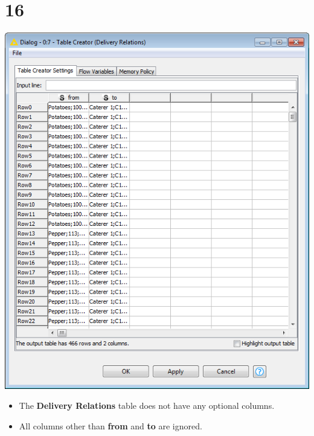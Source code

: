 \documentclass[10pt]{beamer}
\begin{document}
\section{16}
\begin{frame}
	\begin{center}
  		\includegraphics[height=0.6\textheight]{16.png}
	\end{center}
	\begin{itemize}
		\item The \textbf{Delivery Relations} table does not have any optional columns.
		\item All columns other than \textbf{from} and \textbf{to} are ignored.
	\end{itemize}
\end{frame}
\end{document}
